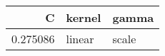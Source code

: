 \begin{tabular}{rll}
\toprule
C & kernel & gamma \\
\midrule
0.275086 & linear & scale \\
\bottomrule
\end{tabular}
